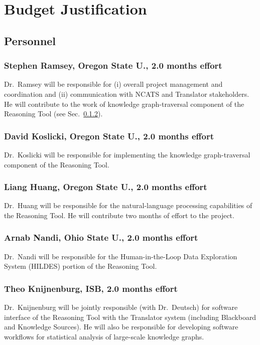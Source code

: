 \documentclass[11pt,notitlepage]{article}
\begin{document}
\section*{Budget Justification}

\subsection{Personnel}

\subsubsection{Stephen Ramsey, Oregon State U., 2.0 months effort}
Dr.~Ramsey will be responsible for (i) overall project management and
coordination and (ii) communication with NCATS and Translator stakeholders. He
will contribute to the work of knowledge graph-traversal component of the
Reasoning Tool (see Sec.~\ref{sec:koslicki}). 

\subsubsection{David Koslicki, Oregon State U., 2.0 months effort}
\label{sec:koslicki}
Dr.~Koslicki will be responsible for implementing the knowledge graph-traversal
component of the Reasoning Tool. 

\subsubsection{Liang Huang, Oregon State U., 2.0 months effort}
Dr.~Huang will be responsible for the natural-language processing capabilities of
the Reasoning Tool. He will contribute two months of effort to the
project.

\subsubsection{Arnab Nandi, Ohio State U., 2.0 months effort}
Dr.~Nandi will be responsible for the Human-in-the-Loop Data Exploration System (HILDES)
portion of the Reasoning Tool. 

\subsubsection{Theo Knijnenburg, ISB, 2.0 months effort}
Dr.~Knijnenburg will be jointly responsible (with Dr.~Deutsch) for software
interface of the Reasoning Tool with the Translator system (including Blackboard
and Knowledge Sources). He will also be responsible for developing software
workflows for statistical analysis of large-scale knowledge graphs. 
\end{document}
